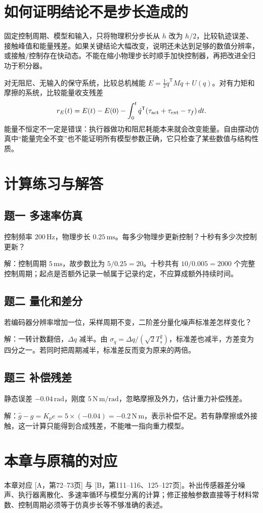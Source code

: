 \section{如何证明结论不是步长造成的}

固定控制周期、模型和输入，只将物理积分步长从 $h$ 改为 $h/2$，比较轨迹误差、接触峰值和能量残差。如果关键结论大幅改变，说明还未达到足够的数值分辨率，或接触/控制存在快动态。不能在缩小物理步长时顺手加快控制器，再把改进全归功于积分器。

对无阻尼、无输入的保守系统，比较总机械能 $E=\tfrac12\dot q^\mathsf TM\dot q+U(q)$。对有力矩和摩擦的系统，比较能量收支残差
\begin{equation}
r_E(t)=E(t)-E(0)-\int_0^t\dot q^\mathsf T(\tau_{\rm act}+\tau_{\rm ext}-\tau_f)\,dt.
\end{equation}
能量不恒定不一定是错误：执行器做功和阻尼耗能本来就会改变能量。自由摆动仿真中“能量完全不变”也不能证明所有模型参数正确，它只检查了某些数值与结构性质。

\section{计算练习与解答}

\subsection*{题一 多速率仿真}
控制频率 $200\,\mathrm{Hz}$，物理步长 $0.25\,\mathrm{ms}$。每多少物理步更新控制？十秒有多少次控制更新？

解：控制周期 $5\,\mathrm{ms}$，故步数比为 $5/0.25=20$。十秒共有 $10/0.005=2000$ 个完整控制周期；起点是否额外记录一帧属于记录约定，不应算成额外持续时间。

\subsection*{题二 量化和差分}
若编码器分辨率增加一位，采样周期不变，二阶差分量化噪声标准差怎样变化？

解：一转计数翻倍，$\Delta q$ 减半。由 $\sigma_{\ddot q}=\Delta q/(\sqrt2T_s^2)$，标准差也减半，方差变为四分之一。若同时把周期减半，标准差反而变为原来的两倍。

\subsection*{题三 补偿残差}
静态误差 $-0.04\,\mathrm{rad}$，刚度 $5\,\mathrm{N\,m/rad}$，忽略摩擦及外力，估计重力补偿残差。

解：$\hat g-g=K_pe=5\times(-0.04)=-0.2\,\mathrm{N\,m}$，表示补偿不足。若有静摩擦或外接触，这一计算只能得到合成残差，不能唯一指向重力模型。

\section*{本章与原稿的对应}
本章对应 [A，第72--73页] 与 [B，第111--116、125--127页]。补出传感器差分噪声、执行器离散化、多速率循环与模型分离的计算；修正接触参数直接等于材料常数、控制周期必须等于仿真步长等不够准确的表述。
